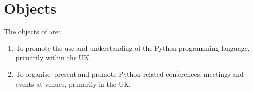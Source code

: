 \section{Objects}\label{sec:objects}
The objects of \shortname{} are:
\begin{enumerate}
    \item To promote the use and understanding of the Python programming language, primarily within the UK\@.
    \item To organise, present and promote Python related conferences, meetings and events at venues, primarily in the UK\@.
\end{enumerate}

